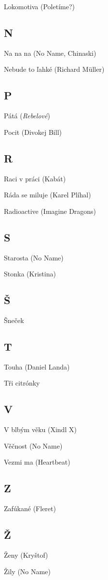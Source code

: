 \begin{multicols}{2}
Lokomotiva (Poletíme?)

\subsection*{N}
Na na na (No Name, Chinaski)

Nebude to ľahké (Richard Müller)

\subsection*{P}
Pátá (\emph{Rebelové})

Pocit (Divokej Bill)

\subsection*{R}
Raci v práci (Kabát)

Ráda se miluje (Karel Plíhal)

Radioactive (Imagine Dragons)

\subsection*{S}
Starosta (No Name)

Stonka (Kristina)

\subsection*{Š}
Šneček

\end{multicols}


\newpage
\begin{multicols}{2}


\subsection*{T}
Touha (Daniel Landa)

Tři citrónky

\subsection*{V}
V blbým věku (Xindl X)

Věčnost (No Name)

Vezmi ma (Heartbeat)

\subsection*{Z}
Zafúkané (Fleret)

\subsection*{Ž}
Ženy (Kryštof)

Žily (No Name)

\end{multicols}

\newpage
